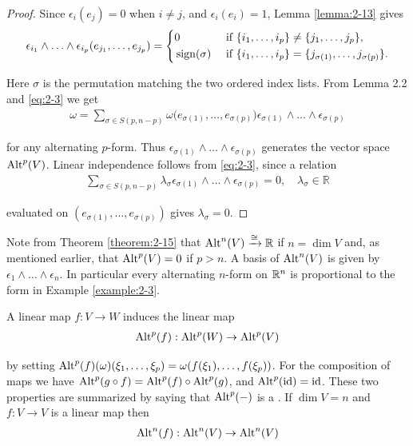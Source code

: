 \begin{proof}
  Since $\epsilon_i(e_j) = 0$ when $i\neq j$, and $\epsilon_i(e_i)= 1$, Lemma \ref{lemma:2-13} gives 
  \begin{align}\label{eq:2-3}
    \epsilon_{i_1}\wedge\ldots\wedge\epsilon_{i_p}(e_{j_1},\ldots,e_{j_p})
    = \left\{\begin{aligned}
      & 0             && \text{ if } \{i_1, \ldots, i_p\}\neq \{j_1, \ldots, j_p\},\\
      & \operatorname{sign}(\sigma) && \text{ if } \{i_1, \ldots, i_p\} = \{j_{\sigma(1)}, \ldots, j_{\sigma(p)}\}.
    \end{aligned}\right.
  \end{align}

  Here $\sigma$ is the permutation matching the two ordered index lists. From Lemma 2.2 and \eqref{eq:2-3} we get
  \begin{align*}
    \omega = \sum_{\sigma\in S(p,n-p)}\omega\big(e_{\sigma(1)},\ldots,e_{\sigma(p)}\big)
      \epsilon_{\sigma(1)}\wedge\ldots\wedge\epsilon_{\sigma(p)}
  \end{align*}

  for any alternating $p$-form. Thus $\epsilon_{\sigma(1)}\wedge\ldots\wedge\epsilon_{\sigma(p)}$ generates 
  the vector space $\operatorname{Alt}^p(V)$. Linear independence follows from \eqref{eq:2-3}, since a relation
  \begin{align*}
    \sum_{\sigma\in S(p,n-p)}\lambda_{\sigma}\epsilon_{\sigma(1)}\wedge\ldots\wedge\epsilon_{\sigma(p)}=0,\quad\lambda_{\sigma}\in\mathbb{R}
  \end{align*}

  evaluated on $(e_{\sigma(1)}, \ldots, e_{\sigma(p)})$ gives $\lambda_{\sigma} = 0$.
\end{proof}

Note from Theorem \ref{theorem:2-15} that $\alt^n(V)\xra[\cong]\RR$ if $n = \dim V$ and, as mentioned
earlier, that $\operatorname{Alt}^p(V) = 0$ if $p > n$. A basis of $\operatorname{Alt}^n(V)$ is given by $\epsilon_{1}\wedge\ldots\wedge\epsilon_{n}$.
In particular every alternating $n$-form on ${\mathbb{R}}^n$ is proportional to the form in Example \ref{example:2-3}.

A linear map $f:V\to W$ induces the linear map 
\begin{align}\label{eq:2-4}
  \operatorname{Alt}^p(f): \operatorname{Alt}^p(W)\to\operatorname{Alt}^p(V)
\end{align}

by setting $\operatorname{Alt}^p(f)(\omega)(\xi_1, \ldots, \xi_p) = \omega(f(\xi_1), \ldots, f(\xi_p))$. For the composition of
maps we have $\operatorname{Alt}^p(g\circ f) = \operatorname{Alt}^p(f)\circ\operatorname{Alt}^p(g)$, and $\operatorname{Alt}^p(\operatorname{id}) = \operatorname{id}$. These two
properties are summarized by saying that $\operatorname{Alt}^p(-)$ is a . If $\dim V = n$ and 
$f:V\to V$ is a linear map then
\begin{align*}
  \operatorname{Alt}^n(f): \operatorname{Alt}^n(V)\to\operatorname{Alt}^n(V)
\end{align*}

